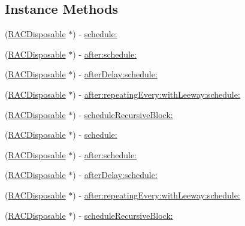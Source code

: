 \subsection*{Instance Methods}
\begin{DoxyCompactItemize}
\item 
(\mbox{\hyperlink{interface_r_a_c_disposable}{R\+A\+C\+Disposable}} $\ast$) -\/ \mbox{\hyperlink{interface_r_a_c_scheduler_ab8e7e6634a86734797fa8db0919f9c16}{schedule\+:}}
\item 
(\mbox{\hyperlink{interface_r_a_c_disposable}{R\+A\+C\+Disposable}} $\ast$) -\/ \mbox{\hyperlink{interface_r_a_c_scheduler_ada2a84ec6cf8eed043bcef654334c601}{after\+:schedule\+:}}
\item 
(\mbox{\hyperlink{interface_r_a_c_disposable}{R\+A\+C\+Disposable}} $\ast$) -\/ \mbox{\hyperlink{interface_r_a_c_scheduler_acc37181185138cba688a6e90da1a62fe}{after\+Delay\+:schedule\+:}}
\item 
(\mbox{\hyperlink{interface_r_a_c_disposable}{R\+A\+C\+Disposable}} $\ast$) -\/ \mbox{\hyperlink{interface_r_a_c_scheduler_ae0e70791e20c43df48d62eedbfa236ba}{after\+:repeating\+Every\+:with\+Leeway\+:schedule\+:}}
\item 
(\mbox{\hyperlink{interface_r_a_c_disposable}{R\+A\+C\+Disposable}} $\ast$) -\/ \mbox{\hyperlink{interface_r_a_c_scheduler_aff5ee7293a775dc51a4ae35fb91ab13b}{schedule\+Recursive\+Block\+:}}
\item 
(\mbox{\hyperlink{interface_r_a_c_disposable}{R\+A\+C\+Disposable}} $\ast$) -\/ \mbox{\hyperlink{interface_r_a_c_scheduler_ab8e7e6634a86734797fa8db0919f9c16}{schedule\+:}}
\item 
(\mbox{\hyperlink{interface_r_a_c_disposable}{R\+A\+C\+Disposable}} $\ast$) -\/ \mbox{\hyperlink{interface_r_a_c_scheduler_ada2a84ec6cf8eed043bcef654334c601}{after\+:schedule\+:}}
\item 
(\mbox{\hyperlink{interface_r_a_c_disposable}{R\+A\+C\+Disposable}} $\ast$) -\/ \mbox{\hyperlink{interface_r_a_c_scheduler_acc37181185138cba688a6e90da1a62fe}{after\+Delay\+:schedule\+:}}
\item 
(\mbox{\hyperlink{interface_r_a_c_disposable}{R\+A\+C\+Disposable}} $\ast$) -\/ \mbox{\hyperlink{interface_r_a_c_scheduler_ae0e70791e20c43df48d62eedbfa236ba}{after\+:repeating\+Every\+:with\+Leeway\+:schedule\+:}}
\item 
(\mbox{\hyperlink{interface_r_a_c_disposable}{R\+A\+C\+Disposable}} $\ast$) -\/ \mbox{\hyperlink{interface_r_a_c_scheduler_aff5ee7293a775dc51a4ae35fb91ab13b}{schedule\+Recursive\+Block\+:}}

\end{DoxyCompactItemize}

